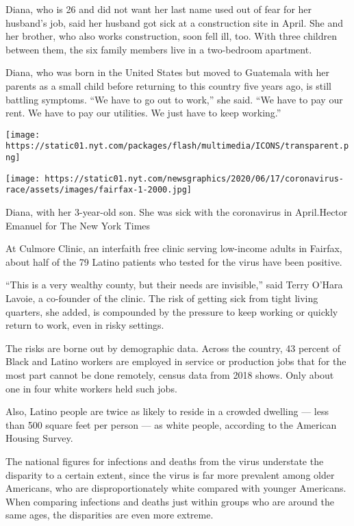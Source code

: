 Diana, who is 26 and did not want her last name used out of fear for her
husband's job, said her husband got sick at a construction site in
April. She and her brother, who also works construction, soon fell ill,
too. With three children between them, the six family members live in a
two-bedroom apartment.

Diana, who was born in the United States but moved to Guatemala with her
parents as a small child before returning to this country five years
ago, is still battling symptoms. ``We have to go out to work,'' she
said. ``We have to pay our rent. We have to pay our utilities. We just
have to keep working.''

\texttt{[image: https://static01.nyt.com/packages/flash/multimedia/ICONS/transparent.png]}

\texttt{[image: https://static01.nyt.com/newsgraphics/2020/06/17/coronavirus-race/assets/images/fairfax-1-2000.jpg]}

Diana, with her 3-year-old son. She was sick with the coronavirus in
April.Hector Emanuel for The New York Times

At Culmore Clinic, an interfaith free clinic serving low-income adults
in Fairfax, about half of the 79 Latino patients who tested for the
virus have been positive.

``This is a very wealthy county, but their needs are invisible,'' said
Terry O'Hara Lavoie, a co-founder of the clinic. The risk of getting
sick from tight living quarters, she added, is compounded by the
pressure to keep working or quickly return to work, even in risky
settings.

The risks are borne out by demographic data. Across the country, 43
percent of Black and Latino workers are employed in service or
production jobs that for the most part cannot be done remotely, census
data from 2018 shows. Only about one in four white workers held such
jobs.

Also, Latino people are twice as likely to reside in a crowded dwelling
--- less than 500 square feet per person --- as white people, according
to the American Housing Survey.

The national figures for infections and deaths from the virus understate
the disparity to a certain extent, since the virus is far more prevalent
among older Americans, who are disproportionately white compared with
younger Americans. When comparing infections and deaths just within
groups who are around the same ages, the disparities are even more
extreme.

